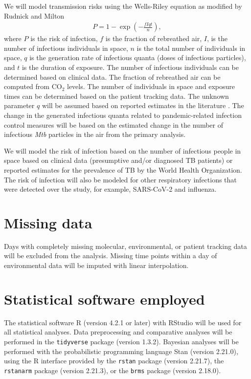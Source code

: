 \documentclass{article}
\begin{document}
We will model transmission risks using the Wells-Riley equation\cite{Riley1962ARRD} as modified by Rudnick and Milton\cite{Rudnick2003IndoorAir} 
\begin{align*}
    P = 1 - \exp\left(-\frac{fIqt}{n}\right),
\end{align*}
where $P$ is the risk of infection, $f$ is the fraction of rebreathed air, $I$, is the number of infectious individuals in space, $n$ is the total number of individuals in space, $q$ is the generation rate of infectious quanta (doses of infectious particles), and $t$ is the duration of exposure. The number of infectious individuals can be determined based on clinical data. The fraction of rebreathed air can be computed from CO$_2$ levels. The number of individuals in space and exposure times can be determined based on the patient tracking data. The unknown parameter $q$ will be assumed based on reported estimates in the literature \cite{Andrews2014JID,Escombe2008PLoSMed,Nardell1991ARRD,Riley1962ARRD}. The change in the generated infectious quanta related to pandemic-related infection control measures will be based on the estimated change in the number of infectious \emph{Mtb} particles in the air from the primary analysis. 

We will model the risk of infection based on the number of infectious people in space based on clinical data (presumptive and/or diagnosed TB patients) or reported estimates for the prevalence of TB by the World Health Organization\cite{WHO2022TBReport}. The risk of infection will also be modeled for other respiratory infections that were detected over the study, for example, SARS-CoV-2 and influenza.

\section{Missing data}

Days with completely missing molecular, environmental, or patient tracking data will be excluded from the analysis. Missing time points within a day of environmental data will be imputed with linear interpolation. 

\section{Statistical software employed}

The statistical software R (version 4.2.1 or later) with RStudio will be used for all statistical analyses. Data preprocessing and comparative analyses will be performed in the \texttt{tidyverse} package (version 1.3.2). Bayesian analyses will be performed with the probabilistic programming language Stan (version 2.21.0), using the R interface provided by the \texttt{rstan} package (version 2.21.7), the \texttt{rstanarm} package (version 2.21.3), or the \texttt{brms} package (version 2.18.0).



\end{document}
